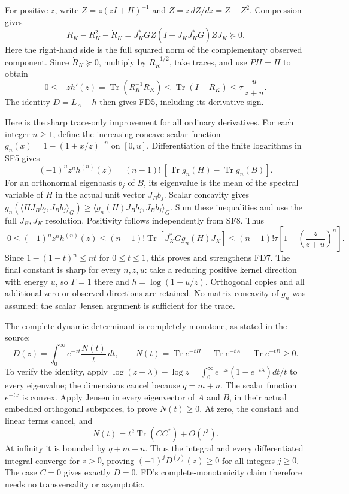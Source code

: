 \documentclass[10pt]{article}
\begin{document}
For positive \(z\), write \(Z=z(zI+H)^{-1}\) and \(\dot Z=z\,dZ/dz=Z-Z^2\). Compression gives \[
 R_K-R_K^2-\dot R_K
 =J_K^*GZ(I-J_KJ_K^*G)ZJ_K\succeq0.
\] Here the right-hand side is the full squared norm of the complementary observed component. Since \(\dot R_K\succeq0\), multiply by \(R_K^{-1/2}\), take traces, and use \(P H=H\) to obtain \[
 0\le-zh'(z)=\operatorname{Tr}(R_K^{-1}\dot R_K)
 \le\operatorname{Tr}(I-R_K)
 \le \tau\,\frac{u}{z+u}.
 \tag{SF9}
\] The identity \(D=L_A-h\) then gives FD5, including its derivative sign.

Here is the sharp trace-only improvement for all ordinary derivatives. For each integer \(n\ge1\), define the increasing concave scalar function \(g_n(x)=1-(1+x/z)^{-n}\) on \([0,u]\). Differentiation of the finite logarithms in SF5 gives \[
 (-1)^n z^nh^{(n)}(z)
 =(n-1)!\,[\operatorname{Tr}g_n(H)-\operatorname{Tr}g_n(B)].
\] For an orthonormal eigenbasis \(b_j\) of \(B\), its eigenvalue is the mean of the spectral variable of \(H\) in the actual unit vector \(J_Bb_j\). Scalar concavity gives \(g_n(\langle HJ_Bb_j,J_Bb_j\rangle_G)
\ge\langle g_n(H)J_Bb_j,J_Bb_j\rangle_G\). Sum these inequalities and use the full \(J_B,J_K\) resolution. Positivity follows independently from SF8. Thus \[
 \boxed{\;
 0\le(-1)^n z^nh^{(n)}(z)
 \le(n-1)!\operatorname{Tr}[J_K^*Gg_n(H)J_K]
 \le(n-1)!\tau\left[1-\left(\frac z{z+u}\right)^n\right].
 \;}
 \tag{SF10}
\] Since \(1-(1-t)^n\le nt\) for \(0\le t\le1\), this proves and strengthens FD7. The final constant is sharp for every \(n,z,u\): take a reducing positive kernel direction with energy \(u\), so \(\Gamma=1\) there and \(h=\log(1+u/z)\). Orthogonal copies and all additional zero or observed directions are retained. No matrix concavity of \(g_n\) was assumed; the scalar Jensen argument is sufficient for the trace.

The complete dynamic determinant is completely monotone, as stated in the source: \[
 D(z)=\int_0^\infty e^{-zt}\frac{N(t)}t\,dt,\qquad
 N(t)=\operatorname{Tr}e^{-tH}-\operatorname{Tr}e^{-tA}
      -\operatorname{Tr}e^{-tB}\ge0 .
 \tag{SF11}
\] To verify the identity, apply \(\log(z+\lambda)-\log z=\int_0^\infty e^{-zt}(1-e^{-t\lambda})dt/t\) to every eigenvalue; the dimensions cancel because \(q=m+n\). The scalar function \(e^{-tx}\) is convex. Apply Jensen in every eigenvector of \(A\) and \(B\), in their actual embedded orthogonal subspaces, to prove \(N(t)\ge0\). At zero, the constant and linear terms cancel, and \[
 N(t)=t^2\operatorname{Tr}(CC^*)+O(t^3).
\] At infinity it is bounded by \(q+m+n\). Thus the integral and every differentiated integral converge for \(z>0\), proving \((-1)^jD^{(j)}(z)\ge0\) for all integers \(j\ge0\). The case \(C=0\) gives exactly \(D=0\). FD's complete-monotonicity claim therefore needs no transversality or asymptotic.
\end{document}
